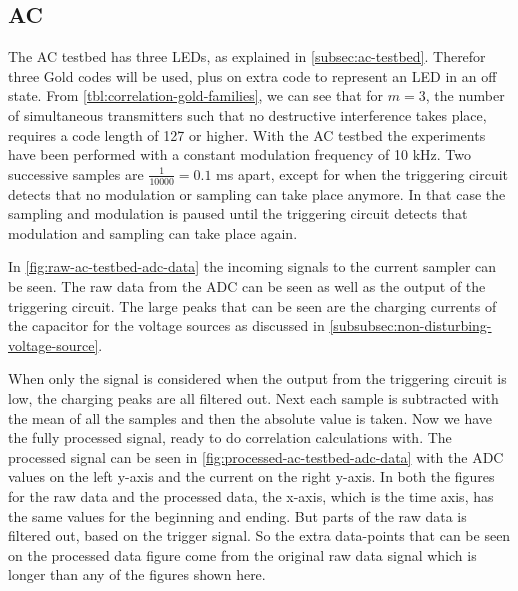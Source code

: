 
\subsection{AC}
\label{subsec:ac-evaluation}


The AC testbed has three LEDs, as explained in \autoref{subsec:ac-testbed}.
Therefor three Gold codes will be used, plus on extra code to represent an LED in an off state.
From \autoref{tbl:correlation-gold-families}, we can see that for $m = 3$, the number of simultaneous transmitters such that no destructive interference takes place, requires a code length of 127 or higher.
With the AC testbed the experiments have been performed with a constant modulation frequency of 10 kHz.
Two successive samples are $\frac{1}{10000} = 0.1$ ms apart, except for when the triggering circuit detects that no modulation or sampling can take place anymore.
In that case the sampling and modulation is paused until the triggering circuit detects that modulation and sampling can take place again.


In \autoref{fig:raw-ac-testbed-adc-data} the incoming signals to the current sampler can be seen.
The raw data from the ADC can be seen as well as the output of the triggering circuit.
The large peaks that can be seen are the charging currents of the capacitor for the voltage sources as discussed in \autoref{subsubsec:non-disturbing-voltage-source}.

When only the signal is considered when the output from the triggering circuit is low, the charging peaks are all filtered out.
Next each sample is subtracted with the mean of all the samples and then the absolute value is taken.
Now we have the fully processed signal, ready to do correlation calculations with.
The processed signal can be seen in \autoref{fig:processed-ac-testbed-adc-data} with the ADC values on the left y-axis and the current on the right y-axis.
In both the figures for the raw data and the processed data, the x-axis, which is the time axis, has the same values for the beginning and ending.
But parts of the raw data is filtered out, based on the trigger signal.
So the extra data-points that can be seen on the processed data figure come from the original raw data signal which is longer than any of the figures shown here.



